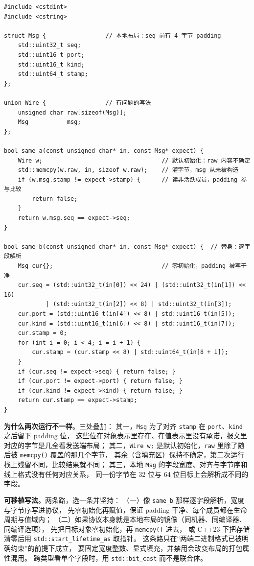 \documentclass[12pt,a4paper,fontset=fandol]{ctexbook}
\newcommand{\cpp}[1]{C++#1}
\newcommand{\Fn}[1]{\texttt{#1()}}
\newcommand{\Tp}[1]{\texttt{#1}}
\newcommand{\Bk}{\discretionary{}{}{}}
\begin{document}
\begin{lstlisting}[style=cppstyle, caption={踩坑写法与其可移植替身}]
#include <cstdint>
#include <cstring>

struct Msg {                 // 本地布局：seq 前有 4 字节 padding
    std::uint32_t seq;
    std::uint16_t port;
    std::uint16_t kind;
    std::uint64_t stamp;
};

union Wire {                 // 有问题的写法
    unsigned char raw[sizeof(Msg)];
    Msg           msg;
};

bool same_a(const unsigned char* in, const Msg* expect) {
    Wire w;                                  // 默认初始化：raw 内容不确定
    std::memcpy(w.raw, in, sizeof w.raw);    // 灌字节，msg 从未被构造
    if (w.msg.stamp != expect->stamp) {      // 读非活跃成员，padding 参与比较
        return false;
    }
    return w.msg.seq == expect->seq;
}

bool same_b(const unsigned char* in, const Msg* expect) {  // 替身：逐字段解析
    Msg cur{};                               // 零初始化，padding 被写干净
    cur.seq = (std::uint32_t(in[0]) << 24) | (std::uint32_t(in[1]) << 16)
            | (std::uint32_t(in[2]) << 8) | std::uint32_t(in[3]);
    cur.port = (std::uint16_t(in[4]) << 8) | std::uint16_t(in[5]);
    cur.kind = (std::uint16_t(in[6]) << 8) | std::uint16_t(in[7]);
    cur.stamp = 0;
    for (int i = 0; i < 4; i = i + 1) {
        cur.stamp = (cur.stamp << 8) | std::uint64_t(in[8 + i]);
    }
    if (cur.seq != expect->seq) { return false; }
    if (cur.port != expect->port) { return false; }
    if (cur.kind != expect->kind) { return false; }
    return cur.stamp == expect->stamp;
}
\end{lstlisting}

\textbf{为什么两次运行不一样}。三处叠加：
其一，\Tp{Msg} 为了对齐 \Tp{stamp} 在 \Tp{port}、\Tp{kind} 之后留下 padding 位，
这些位在对象表示里存在、在值表示里没有承诺，报文里对应的字节是几全看发送端布局；
其二，\Tp{Wire w;} 是默认初始化，\Tp{raw} 里除了随后被 \Fn{memcpy} 覆盖的那几个字节，
其余（含填充区）保持不确定，第二次运行栈上残留不同，比较结果就不同；
其三，本地 \Tp{Msg} 的字段宽度、对齐与字节序和线上格式没有任何对应关系，
同一份字节在 32 位与 64 位目标上会解析成不同的字段。

\textbf{可移植写法}。两条路，选一条并坚持：
（一）像 \Tp{same\_b} 那样逐字段解析，宽度与字节序写进协议，
先零初始化再赋值，保证 padding 干净、每个成员都在生命周期与值域内；
（二）如果协议本身就是本地布局的镜像（同机器、同编译器、同编译选项），
先把目标对象零初始化，再 \Fn{memcpy} 进去，
或 \cpp{23} 下把存储清零后用 \Tp{std::start{\Bk}\_lifetime{\Bk}\_as} 取指针。
这条路只在“两端二进制格式已被明确约束”的前提下成立，
要固定宽度整数、显式填充，并禁用会改变布局的打包属性混用。
跨类型看单个字段时，用 \Tp{std::bit\_cast} 而不是联合体。
\end{document}

